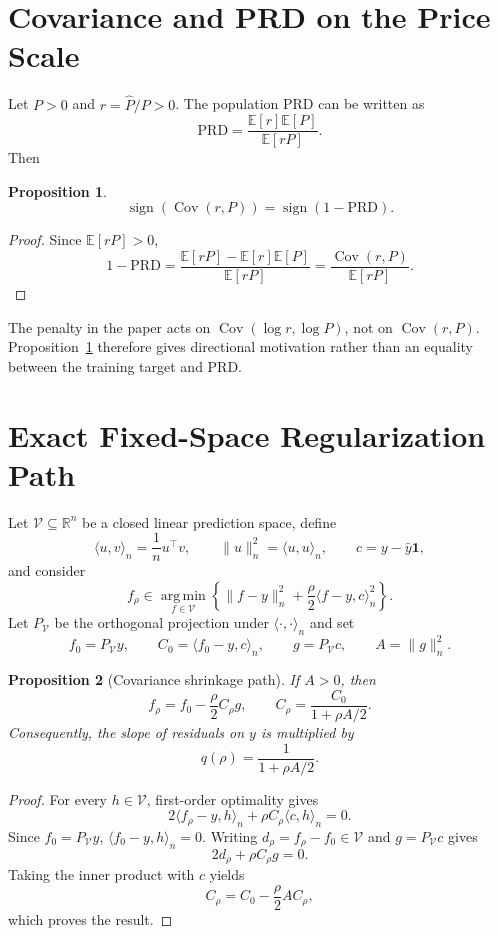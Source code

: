 \documentclass[10pt]{article}
\newtheorem{proposition}{Proposition}
\theoremstyle{definition}
\newcommand{\R}{\mathbb{R}}
\newcommand{\E}{\mathbb{E}}
\newcommand{\Cov}{\operatorname{Cov}}
\newcommand{\1}{\mathbf{1}}
\newcommand{\Vcal}{\mathcal{V}}
\newcommand{\argminop}{\operatorname*{arg\,min}}
\begin{document}
\section{Covariance and PRD on the Price Scale}
\label{app:cov_prd}

Let $P>0$ and $r=\widehat P/P>0$. The population PRD can be written as
\[
\mathrm{PRD}
=
\frac{\E[r]\E[P]}{\E[rP]}.
\]
Then
\begin{proposition}
\label{prop:cov_prd}
\[
\operatorname{sign}\!\left(\Cov(r,P)\right)
=
\operatorname{sign}(1-\mathrm{PRD}).
\]
\end{proposition}
\begin{proof}
Since $\E[rP]>0$,
\[
1-\mathrm{PRD}
=
\frac{\E[rP]-\E[r]\E[P]}{\E[rP]}
=
\frac{\Cov(r,P)}{\E[rP]}.
\]
\end{proof}

The penalty in the paper acts on $\Cov(\log r,\log P)$, not on $\Cov(r,P)$. Proposition~\ref{prop:cov_prd} therefore gives directional motivation rather than an equality between the training target and PRD.

\section{Exact Fixed-Space Regularization Path}
\label{app:theory}

Let $\Vcal\subseteq\R^n$ be a closed linear prediction space, define
\[
\langle u,v\rangle_n=\frac{1}{n}u^\top v,
\qquad
\|u\|_n^2=\langle u,u\rangle_n,
\qquad
c=y-\bar y\1,
\]
and consider
\begin{equation}
\label{eq:path_problem}
f_\rho\in\argminop_{f\in\Vcal}
\left\{
\|f-y\|_n^2
+\frac{\rho}{2}\langle f-y,c\rangle_n^2
\right\}.
\end{equation}
Let $P_{\Vcal}$ be the orthogonal projection under $\langle\cdot,\cdot\rangle_n$ and set
\[
f_0=P_{\Vcal}y,\qquad
C_0=\langle f_0-y,c\rangle_n,\qquad
g=P_{\Vcal}c,\qquad
A=\|g\|_n^2.
\]

\begin{proposition}[Covariance shrinkage path]
\label{prop:path}
If $A>0$, then
\[
f_\rho=f_0-\frac{\rho}{2}C_\rho g,
\qquad
C_\rho=\frac{C_0}{1+\rho A/2}.
\]
Consequently, the slope of residuals on $y$ is multiplied by
\[
q(\rho)=\frac{1}{1+\rho A/2}.
\]
\end{proposition}

\begin{proof}
For every $h\in\Vcal$, first-order optimality gives
\[
2\langle f_\rho-y,h\rangle_n
+\rho C_\rho\langle c,h\rangle_n=0.
\]
Since $f_0=P_{\Vcal}y$, $\langle f_0-y,h\rangle_n=0$. Writing
$d_\rho=f_\rho-f_0\in\Vcal$ and $g=P_{\Vcal}c$ gives
\[
2d_\rho+\rho C_\rho g=0.
\]
Taking the inner product with $c$ yields
\[
C_\rho=C_0-\frac{\rho}{2}AC_\rho,
\]
which proves the result.
\end{proof}
\end{document}
